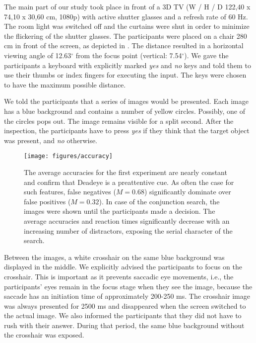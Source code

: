 \documentclass[journal]{vgtc}                %
\begin{document}

The main part of our study took place in front of a 3D TV (W / H / D 122,40 x 74,10 x 30,60 cm, 1080p) with active shutter glasses and a refresh rate of 60 Hz. The room light was switched off and the curtains were shut in order to minimize the flickering of the shutter glasses. The participants were placed on a chair 280 cm in front of the screen, as depicted in . The distance resulted in a horizontal viewing angle of 12.63$^{\circ}$ from the focus point (vertical: 7.54$^{\circ}$). We gave the participants a keyboard with explicitly marked \textit{yes} and \textit{no} keys and told them to use their thumbs or index fingers for executing the input. The keys were chosen to have the maximum possible distance.

We told the participants that a series of images would be presented. Each image has a blue background and contains a number of yellow circles. Possibly, one of the circles pops out. The image remains visible for a split second. After the inspection, the participants have to press \textit{yes} if they think that the target object was present, and \textit{no} otherwise. 



\begin{figure*}[t!]
\centering
\texttt{[image: figures/accuracy]}
\caption{The average accuracies for the first experiment are nearly constant and confirm that Deadeye is a preattentive cue. As often the case for such features, false negatives ($M = 0.68$) significantly dominate over false positives ($M = 0.32$). In case of the conjunction search, the images were shown until the participants made a decision. The average accuracies and reaction times significantly decrease with an increasing number of distractors, exposing the serial character of the search.}
\label{fig:accuracy}
\end{figure*}

Between the images, a white crosshair on the same blue background was displayed in the middle. We explicitly advised the participants to focus on the crosshair. This is important as it prevents saccadic eye movements, i.e., the participants' eyes remain in the focus stage when they see the image, because the saccade has an initiation time of approximately 200-250 ms. The crosshair image was always presented for 2500 ms and disappeared when the screen switched to the actual image. We also informed the participants that they did not have to rush with their answer. During that period, the same blue background without the crosshair was exposed.
\end{document}
